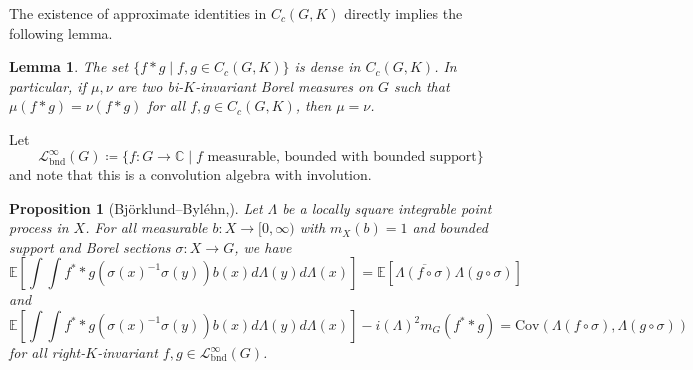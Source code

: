 \documentclass[12pt,reqno,a4paper]{amsart}
\theoremstyle{theorem}
\newtheorem{lemma}[theorem]{Lemma}
\newtheorem{proposition}[theorem]{Proposition}
\theoremstyle{definition}
\numberwithin{theorem}{section}
\numberwithin{equation}{section}
\newcommand{\C}{\mathbb{C}}
\begin{document}
The existence of approximate identities in $C_c(G, K)$ directly implies the following lemma.
\begin{lemma}\label{l:uniqueness_invariant_mesures}
	The set $\{f*g\mid f,g\in C_c(G,K)\}$ is dense in $C_c(G,K)$. 
	In particular, if $\mu,\nu$ are two bi-$K$-invariant Borel measures on $G$ such that $\mu(f*g) = \nu(f*g)$ for all $f,g\in C_c(G,K)$, then $\mu = \nu$.
\end{lemma}
Let \[\mathcal{L}^\infty_{\mathrm{bnd}}(G)\coloneqq \{f:G\to \C\mid f\text{ measurable, bounded with bounded support}\}\] and note that this is a convolution algebra with involution.
\begin{proposition}[Björklund--Byléhn,\cite{MichaelMattiasArXiv}]\label{p:autocorrelation_and_moments}
	Let $\Lambda$ be a locally square integrable point process in $X$. For all measurable $b:X\to [0,\infty)$ with $m_X(b) = 1$ and bounded support and Borel sections $\sigma:X\to G$, we have
	\[\mathbb{E}\left[\int \int f^**g(\sigma(x)^{-1}\sigma(y))b(x)d\Lambda(y)d\Lambda(x)\right] = \mathbb{E}[\overline{\Lambda(f\circ \sigma)}\Lambda(g\circ \sigma)]\]
	and 
	\[\mathbb{E}\left[\int \int f^**g(\sigma(x)^{-1}\sigma(y))b(x)d\Lambda(y)d\Lambda(x)\right] -i(\Lambda)^2m_G(f^**g) = \mathrm{Cov}(\Lambda(f\circ \sigma),\Lambda(g\circ \sigma))\]
	for all right-$K$-invariant $f,g\in \mathcal{L}_{\mathrm{bnd}}^\infty(G)$.
\end{proposition}
\end{document}
